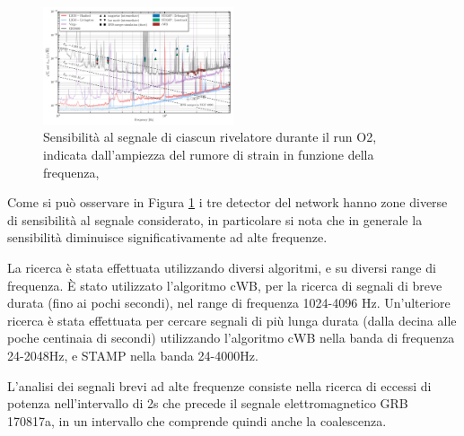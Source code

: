 \begin{figure}
	\vspace{-20pt}
	\begin{center}
		\includegraphics[width=0.5\textwidth]{figures/Capitolo_1/GW170817_spectral_limits.pdf}
	\end{center}
	\vspace{-5pt}
	\caption{Sensibilità al segnale di ciascun rivelatore durante il run O2, indicata dall'ampiezza del rumore di strain in funzione della frequenza, \cite{Abbott_2017b}}
	\label{fig:NoiseFrequenze}
	\vspace{-10pt}
\end{figure}
Come si può osservare in Figura \ref{fig:NoiseFrequenze} i tre detector del network hanno zone diverse di sensibilità al segnale considerato, in particolare si nota che in generale la sensibilità diminuisce significativamente ad alte frequenze. 

La ricerca è stata effettuata utilizzando diversi algoritmi, e su diversi range di frequenza. È stato utilizzato l'algoritmo cWB, per la ricerca di segnali di breve durata (fino ai pochi secondi), nel range di frequenza 1024-4096 Hz. 
Un'ulteriore ricerca è stata effettuata per cercare segnali di più lunga durata (dalla decina alle poche centinaia di secondi) utilizzando l'algoritmo cWB nella banda di frequenza 24-2048Hz, e STAMP nella banda 24-4000Hz.

L'analisi dei segnali brevi ad alte frequenze consiste nella ricerca di eccessi di potenza nell'intervallo di 2s che precede il segnale elettromagnetico GRB 170817a, in un intervallo che comprende quindi anche la coalescenza.

